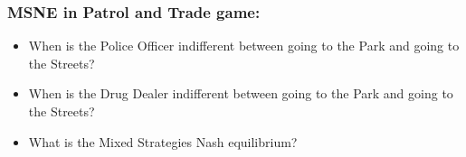 
\begin{frame}
\frametitle{MSNE in Patrol and Trade game:}
\begin{itemize}
\item When is the Police Officer indifferent between going to the Park and going to the Streets?
  \vspace{15mm}

\item When is the Drug Dealer indifferent between going to the Park and going to the Streets?
  \vspace{15mm}

  \item What is the \alert{Mixed Strategies Nash equilibrium?}
  \vspace{15mm}

\end{itemize}
\end{frame}


